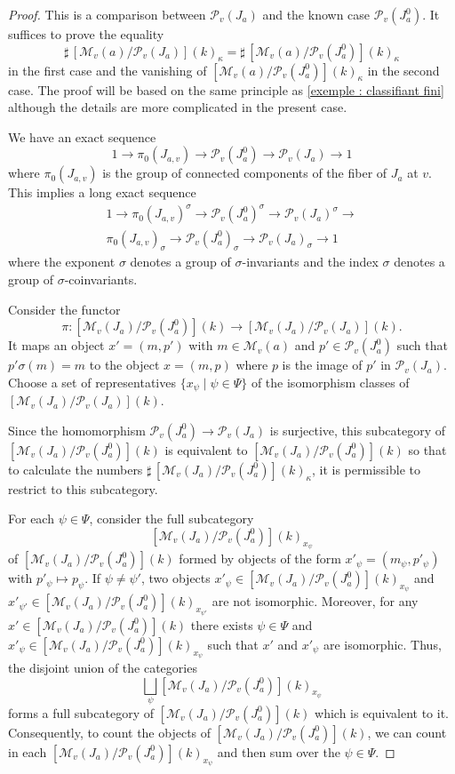 \documentclass[12pt,english]{smfart}
\numberwithin{equation}{subsection}
\theoremstyle{remark}
\newcommand\calP{{\mathscr P}}
\newcommand\calM{{\mathscr M}}
\begin{document}
\begin{proof}
This is a comparison between $\calP_v(J_a)$ and the known case
$\calP_v(J_a^0)$. It suffices to prove the equality
$$
{\sharp\,} [\calM_v(a)/\calP_v(J_a)](k)_\kappa= {\sharp\,}
[\calM_v(a)/\calP_v(J_a^0)](k)_\kappa
$$
in the first case and the vanishing of
$[\calM_v(a)/\calP_v(J_a^0)](k)_\kappa$ in the second case. The
proof will be based on the same principle as \ref{exemple :
classifiant fini} although the details are more complicated in the present
case.


We have an exact sequence
$$
1 \rightarrow \pi_0(J_{a,v}) \rightarrow \calP_v(J_a^0) \rightarrow \calP_v(J_a) \rightarrow 1
$$
where $\pi_0(J_{a,v})$ is the group of connected components of the fiber
of $J_a$ at $v$. This implies a long exact sequence
\begin{eqnarray}
1 \rightarrow \pi_0(J_{a,v})^\sigma \rightarrow \calP_v(J_a^0)^\sigma \rightarrow
\calP_v(J_a)^\sigma \rightarrow \\
\pi_0(J_{a,v})_\sigma \rightarrow \calP_v(J_a^0)_\sigma \rightarrow
\calP_v(J_a)_\sigma \rightarrow 1
\end{eqnarray}
where the exponent $\sigma$ denotes a group of $\sigma$-invariants and
the index $\sigma$ denotes a group of $\sigma$-coinvariants.

Consider the functor
$$\pi:[\calM_v(J_a)/\calP_v(J_a^0)](k) \rightarrow  [\calM_v(J_a)/\calP_v(J_a)](k).$$
It maps an object $x'=(m,p')$ with $m\in\calM_v(a)$ and $p'\in
\calP_v(J_a^0)$ such that $p' \sigma(m)=m$ to the object $x=(m,p)$ where $p$
is the image of $p'$ in $\calP_v(J_a)$. Choose a set of
representatives $\{x_\psi\mid \psi\in \Psi\}$ of the isomorphism classes of
$[\calM_v(J_a)/\calP_v(J_a)](k)$.

Since the homomorphism $\calP_v(J_a^0)\rightarrow \calP_v(J_a)$ is
surjective, this subcategory of $[\calM_v(J_a)/\calP_v(J_a^0)](k)$ is
equivalent to $[\calM_v(J_a)/\calP_v(J_a^0)](k)$ so that to
calculate the numbers ${\sharp\,} [\calM_v(J_a)/\calP_v(J_a^0)](k)_\kappa$,
it is permissible to restrict to this subcategory.

For each $\psi\in \Psi$, consider the full subcategory
$$[\calM_v(J_a)/\calP_v(J_a^0)](k)_{x_\psi}$$
of $[\calM_v(J_a)/\calP_v(J_a^0)](k)$ formed by objects of the form
$x'_\psi=(m_\psi,p'_\psi)$ with $p'_\psi\mapsto p_\psi$. If $\psi\not=\psi'$,
two objects $x'_\psi\in [\calM_v(J_a)/\calP_v(J_a^0)](k)_{x_\psi}$ and
$x'_{\psi'}\in [\calM_v(J_a)/\calP_v(J_a^0)](k)_{x_{\psi'}}$ are not
isomorphic. Moreover, for any $x'\in [\calM_v(J_a)/\calP_v(J_a^0)](k)$ there
exists $\psi\in \Psi$ and $x'_{\psi}\in [\calM_v(J_a)/\calP_v(J_a^0)]
(k)_{x_\psi}$ such that $x'$ and $x'_\psi$ are isomorphic. Thus, the
disjoint union of the categories
$$\bigsqcup_\psi [\calM_v(J_a)/\calP_v(J_a^0)](k)_{x_\psi}$$
forms a full subcategory of $[\calM_v(J_a)/\calP_v(J_a^0)](k)$
which is equivalent to it. Consequently, to count the objects of
$[\calM_v(J_a)/\calP_v(J_a^0)](k)$, we can count in each
$[\calM_v(J_a)/\calP_v(J_a^0)](k)_{x_\psi}$ and then sum over the
$\psi\in \Psi$.


\end{proof}
\end{document}
